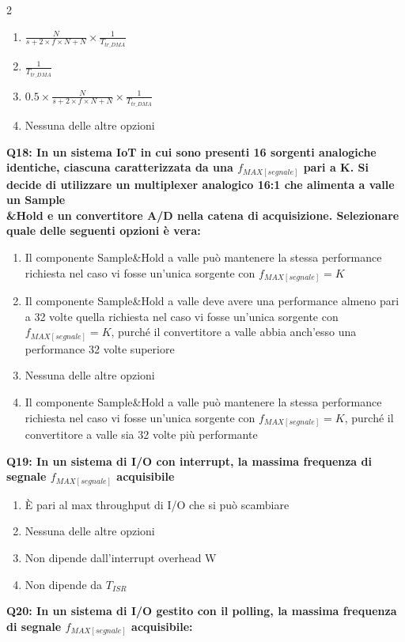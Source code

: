 \documentclass[10pt]{article}
\begin{document}
\begin{multicols}{2}
\begin{enumerate}[label=\arabic*.]
\item $\frac{N}{s+ 2 \times f \times N + N} \times \frac{1}{T_{tr\_DMA}} $
\item $\frac{1}{T_{tr\_DMA}}$
\item $0.5 \times \frac{N}{s+ 2 \times f \times N + N} \times \frac{1}{T_{tr\_DMA}} $
\item Nessuna delle altre opzioni
\end{enumerate}
\textbf{Q18: In un sistema IoT in cui sono presenti 16 sorgenti analogiche identiche, ciascuna caratterizzata da una $f_{MAX[segnale]}$ pari a K. Si decide di utilizzare un multiplexer analogico 16:1 che alimenta a valle un Sample\\\&Hold e un convertitore A/D nella catena di acquisizione. Selezionare quale delle seguenti opzioni è vera:}

\begin{enumerate}[label=\arabic*.]
\item Il componente Sample\&Hold a valle può mantenere la stessa performance richiesta nel caso vi fosse un'unica sorgente con $f_{MAX[segnale]} = K$
\item Il componente Sample\&Hold a valle deve avere una performance almeno pari a 32 volte quella richiesta nel caso vi fosse un'unica sorgente con $f_{MAX[segnale]} = K$, purché il convertitore a valle abbia anch’esso una performance 32 volte superiore
\item Nessuna delle altre opzioni
\item Il componente Sample\&Hold a valle può mantenere la stessa performance richiesta nel caso vi fosse un'unica sorgente con $f_{MAX[segnale]} = K$, purché il convertitore a valle sia 32 volte più performante
\end{enumerate}
\textbf{Q19: In un sistema di I/O con interrupt, la massima frequenza di segnale $f_{MAX[segnale]}$ acquisibile}

\begin{enumerate}[label=\arabic*.]
\item È pari al max throughput di I/O che si può scambiare
\item Nessuna delle altre opzioni
\item Non dipende dall’interrupt overhead W
\item Non dipende da $T_{ISR}$
\end{enumerate}
\textbf{Q20: In un sistema di I/O gestito con il polling, la massima frequenza di segnale $f_{MAX[segnale]}$ acquisibile:}


\end{multicols}
\end{document}
